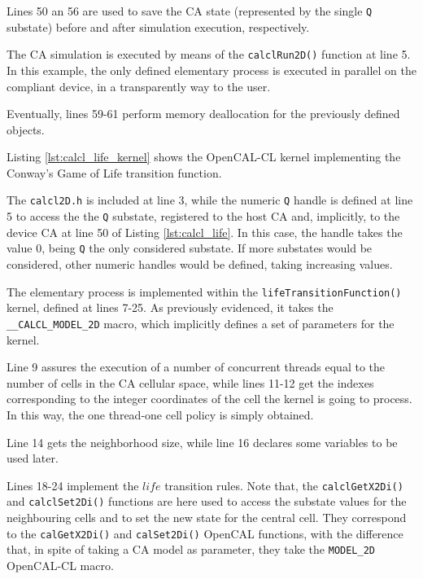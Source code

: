 Lines 50 an 56 are used to save the CA state (represented by the
single \verb'Q' substate) before and after simulation execution,
respectively.

The CA simulation is executed by means of the \verb'calclRun2D()'
function at line 5. In this example, the only defined elementary
process is executed in parallel on the compliant device, in a
transparently way to the user.

Eventually, lines 59-61 perform memory deallocation for the previously
defined objects.



Listing \ref{lst:calcl_life_kernel} shows the OpenCAL-CL kernel
implementing the Conway's Game of Life transition function.

The \verb'calcl2D.h' is included at line 3, while the numeric \verb'Q'
handle is defined at line 5 to access the the \verb'Q' substate,
registered to the host CA and, implicitly, to the device CA at line 50
of Listing \ref{lst:calcl_life}. In this case, the handle takes the
value 0, being \verb'Q' the only considered substate. If more
substates would be considered, other numeric handles would be defined,
taking increasing values.

The elementary process is implemented within the
\verb'lifeTransitionFunction()' kernel, defined at lines 7-25. As
previously evidenced, it takes the \verb'__CALCL_MODEL_2D' macro,
which implicitly defines a set of parameters for the kernel.

Line 9 assures the execution of a number of concurrent threads equal to
the number of cells in the CA cellular space, while lines 11-12 get the
indexes corresponding to the integer coordinates of the cell the
kernel is going to process. In this way, the one thread-one cell
policy is simply obtained.

Line 14 gets the neighborhood size, while line 16 declares some
variables to be used later.

Lines 18-24 implement the $life$ transition rules. Note that, the
\verb'calclGetX2Di()' and \verb'calclSet2Di()' functions are here used
to access the substate values for the neighbouring cells and to set
the new state for the central cell. They correspond to the
\verb'calGetX2Di()' and \verb'calSet2Di()' OpenCAL functions, with the
difference that, in spite of taking a CA model as parameter, they take
the \verb'MODEL_2D' OpenCAL-CL macro.

